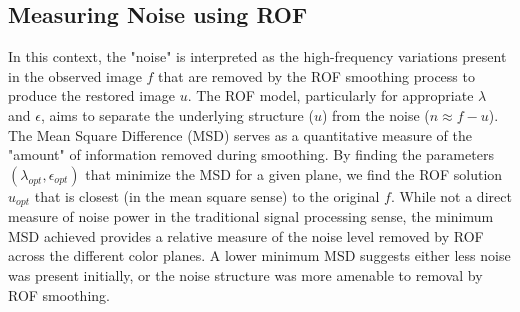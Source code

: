 \documentclass{article}
\begin{document}
	\subsection{Measuring Noise using ROF}
	In this context, the "noise" is interpreted as the high-frequency variations present in the observed image $f$ that are removed by the ROF smoothing process to produce the restored image $u$. The ROF model, particularly for appropriate $\lambda$ and $\epsilon$, aims to separate the underlying structure ($u$) from the noise ($n \approx f-u$).
	The Mean Square Difference (MSD) serves as a quantitative measure of the "amount" of information removed during smoothing. By finding the parameters $(\lambda_{opt}, \epsilon_{opt})$ that minimize the MSD for a given plane, we find the ROF solution $u_{opt}$ that is closest (in the mean square sense) to the original $f$. While not a direct measure of noise power in the traditional signal processing sense, the minimum MSD achieved provides a relative measure of the noise level removed by ROF across the different color planes. A lower minimum MSD suggests either less noise was present initially, or the noise structure was more amenable to removal by ROF smoothing.
	
\end{document}
